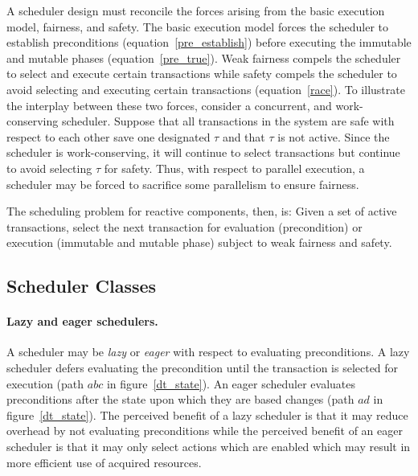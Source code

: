 A scheduler design must reconcile the forces arising from the basic execution model, fairness, and safety.
The basic execution model forces the scheduler to establish preconditions (equation~\ref{pre_establish}) before executing the immutable and mutable phases (equation~\ref{pre_true}).
Weak fairness compels the scheduler to select and execute certain transactions while safety compels the scheduler to avoid selecting and executing certain transactions (equation~\ref{race}).
To illustrate the interplay between these two forces, consider a concurrent, and work-conserving scheduler.
Suppose that all transactions in the system are safe with respect to each other save one designated $\tau$ and that $\tau$ is not active.
Since the scheduler is work-conserving, it will continue to select transactions but continue to avoid selecting $\tau$ for safety.
Thus, with respect to parallel execution, a scheduler may be forced to sacrifice some parallelism to ensure fairness.

The scheduling problem for reactive components, then, is:  Given a set of active transactions, select the next transaction for evaluation (precondition) or execution (immutable and mutable phase) subject to weak fairness and safety.

\subsection{Scheduler Classes}

\paragraph{Lazy and eager schedulers.}
A scheduler may be \emph{lazy} or \emph{eager} with respect to evaluating preconditions.
A lazy scheduler defers evaluating the precondition until the transaction is selected for execution (path $abc$ in figure~\ref{dt_state}).
An eager scheduler evaluates preconditions after the state upon which they are based changes (path $ad$ in figure~\ref{dt_state}).
The perceived benefit of a lazy scheduler is that it may reduce overhead by not evaluating preconditions while the perceived benefit of an eager scheduler is that it may only select actions which are enabled which may result in more efficient use of acquired resources.

